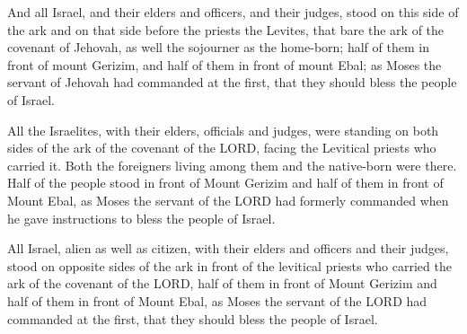 			\begin{versebox}
					\item[BHS] 
					\item[ASV] And all Israel, and their elders and officers, and their judges, stood on this side of the ark and on that side before the priests the Levites, that bare the ark of the covenant of Jehovah, as well the sojourner as the home-born; half of them in front of mount Gerizim, and half of them in front of mount Ebal; as Moses the servant of Jehovah had commanded at the first, that they should bless the people of Israel.
					\item[NIV] All the Israelites, with their elders, officials and judges, were standing on both sides of the ark of the covenant of the LORD, facing the Levitical priests who carried it. Both the foreigners living among them and the native-born were there. Half of the people stood in front of Mount Gerizim and half of them in front of Mount Ebal, as Moses the servant of the LORD had formerly commanded when he gave instructions to bless the people of Israel.
					\item[NRSV] All Israel, alien as well as citizen, with their elders and officers and their judges, stood on opposite sides of the ark in front of the levitical priests who carried the ark of the covenant of the LORD, half of them in front of Mount Gerizim and half of them in front of Mount Ebal, as Moses the servant of the LORD had commanded at the first, that they should bless the people of Israel.
			\end{versebox}

